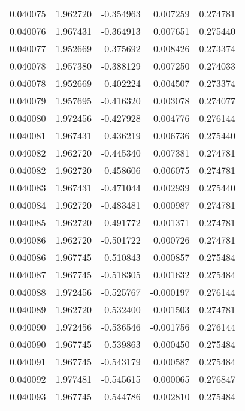 \begin{tabular}{lrrrr}
0.040075    &  1.962720 & -0.354963 &  0.007259 &             0.274781 \\
0.040076    &  1.967431 & -0.364913 &  0.007651 &             0.275440 \\
0.040077    &  1.952669 & -0.375692 &  0.008426 &             0.273374 \\
0.040078    &  1.957380 & -0.388129 &  0.007250 &             0.274033 \\
0.040078    &  1.952669 & -0.402224 &  0.004507 &             0.273374 \\
0.040079    &  1.957695 & -0.416320 &  0.003078 &             0.274077 \\
0.040080    &  1.972456 & -0.427928 &  0.004776 &             0.276144 \\
0.040081    &  1.967431 & -0.436219 &  0.006736 &             0.275440 \\
0.040082    &  1.962720 & -0.445340 &  0.007381 &             0.274781 \\
0.040082    &  1.962720 & -0.458606 &  0.006075 &             0.274781 \\
0.040083    &  1.967431 & -0.471044 &  0.002939 &             0.275440 \\
0.040084    &  1.962720 & -0.483481 &  0.000987 &             0.274781 \\
0.040085    &  1.962720 & -0.491772 &  0.001371 &             0.274781 \\
0.040086    &  1.962720 & -0.501722 &  0.000726 &             0.274781 \\
0.040086    &  1.967745 & -0.510843 &  0.000857 &             0.275484 \\
0.040087    &  1.967745 & -0.518305 &  0.001632 &             0.275484 \\
0.040088    &  1.972456 & -0.525767 & -0.000197 &             0.276144 \\
0.040089    &  1.962720 & -0.532400 & -0.001503 &             0.274781 \\
0.040090    &  1.972456 & -0.536546 & -0.001756 &             0.276144 \\
0.040090    &  1.967745 & -0.539863 & -0.000450 &             0.275484 \\
0.040091    &  1.967745 & -0.543179 &  0.000587 &             0.275484 \\
0.040092    &  1.977481 & -0.545615 &  0.000065 &             0.276847 \\
0.040093    &  1.967745 & -0.544786 & -0.002810 &             0.275484 \\

\end{tabular}
